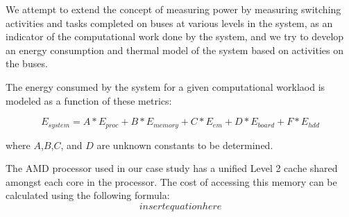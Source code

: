 \documentclass[times, 10pt,onecolumn]{article}
\begin{document}
We attempt to extend the concept of measuring power by measuring
switching activities and tasks completed on buses at various levels in
the system, as an indicator of the computational work done by the
system, and we try to develop an energy consumption and thermal model of
the system based on activities on the buses.

The energy consumed by the system for a given computational worklaod is
modeled as a function of these metrics:

\begin{equation}
\label{eq:linmodel}
E_{system}=  A*E_{proc}+B*E_{memory}+C*E_{em}+D*E_{board}+F*E_{hdd}
\end{equation}

where $A$,$B$,$C$, and $D$ are unknown constants to be determined. 

The AMD processor used in our case study has a unified Level 2 cache
shared amongst each core in the processor.  The cost of accessing this
memory can be calculated using the following formula:
\begin{equation}
  \label{eq:Level1cost}
  insert equation here
\end{equation}
\end{document}
